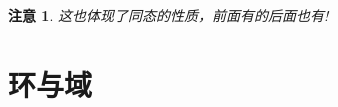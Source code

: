 \documentclass[UTF8]{ctexart}
\newtheorem{Remark}[Definition]{注意}
\begin{document}
\begin{Remark}
这也体现了同态的性质，前面有的后面也有!
\end{Remark}


\section{环与域}
\end{document}
